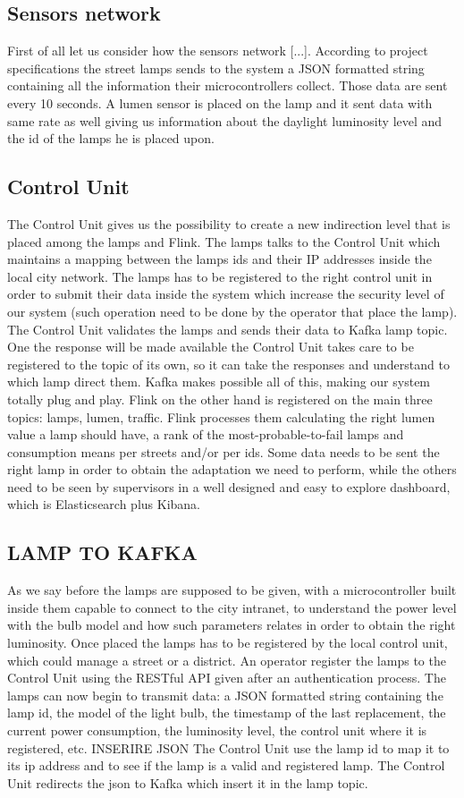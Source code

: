 \subsection{Sensors network}
First of all let us consider how the sensors network [...]. According to project specifications the street lamps sends to the system a JSON formatted string containing all the information their microcontrollers collect. Those data are sent every 10 seconds. A lumen sensor is placed on the lamp and it sent data with same rate as well giving us information about the daylight luminosity level and the id of the lamps he is placed upon.

\subsection{Control Unit}
The Control Unit gives us the possibility to create a new indirection level that is placed among the lamps and Flink. The lamps talks to the Control Unit which maintains a mapping between the lamps ids and their IP addresses inside the local city network. The lamps has to be registered to the right control unit in order to submit their data inside the system which increase the security level of our system (such operation need to be done by the operator that place the lamp). The Control Unit validates the lamps and sends their data to Kafka lamp topic. One the response will be made available the Control Unit takes care to be registered to the topic of its own, so it can take the responses and understand to which lamp direct them. Kafka makes possible all of this, making our system totally plug and play. Flink on the other hand is registered on the main three topics: lamps, lumen, traffic. Flink processes them calculating the right lumen value a lamp should have, a rank of the most-probable-to-fail lamps and consumption means per streets and/or per ids. Some data needs to be sent the right lamp in order to obtain the adaptation we need to perform, while the others need to be seen by supervisors in a well designed and easy to explore dashboard, which is Elasticsearch plus Kibana. 

\subsection{LAMP TO KAFKA}
As we say before the lamps are supposed to be given, with a microcontroller built inside them capable to connect to the city intranet, to understand the power level with the bulb model and how such parameters relates in order to obtain the right luminosity. Once placed the lamps has to be registered by the local control unit, which could manage a street or a district. An operator register the lamps to the Control Unit using the RESTful API given after an authentication process. The lamps can now begin to transmit data: a JSON formatted string containing the lamp id, the model of the light bulb, the timestamp of the last replacement, the current power consumption, the luminosity level, the control unit where it is registered, etc. 
INSERIRE JSON
The Control Unit use the lamp id to map it to its ip address and to see if the lamp is a valid and registered lamp. The Control Unit redirects the json to Kafka which insert it in the lamp topic. 

